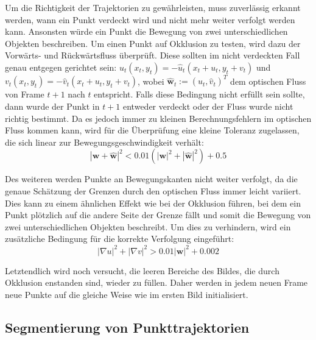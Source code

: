 Um die Richtigkeit der Trajektorien zu gewährleisten, muss zuverlässig erkannt werden, wann ein Punkt verdeckt wird und nicht mehr weiter verfolgt werden
kann. Ansonsten würde ein Punkt die Bewegung von zwei unterschiedlichen Objekten beschreiben. Um einen Punkt auf Okklusion zu testen, wird dazu
der Vorwärts- und Rückwärtsfluss überprüft. Diese sollten im nicht verdeckten Fall genau entgegen gerichtet sein:
$ u_t(x_t,y_t) = -\hat{u}_t(x_t + u_t, y_t + v_t) $ und $ v_t(x_t,y_t) = -\hat{v}_t(x_t + u_t, y_t + v_t) $, wobei
$\hat{\textbf{w}}_t := (\hat{u}_t,\hat{v}_t)^T$ dem optischen Fluss von Frame $t+1$ nach $t$ entspricht. Falls diese Bedingung nicht erfüllt sein sollte,
dann wurde der Punkt in $t+1$ entweder verdeckt oder der Fluss wurde nicht richtig bestimmt. Da es jedoch immer zu kleinen Berechnungsfehlern
im optischen Fluss kommen kann, wird für die Überprüfung eine kleine Toleranz zugelassen, die sich linear zur Bewegungsgeschwindigkeit verhält:
\begin{equation}
  | \textbf{w} + \hat{\textbf{w}}|^2 < 0.01 (|\textbf{w}|^2 + |\hat{\textbf{w}}|^2) + 0.5
\end{equation}

Des weiteren werden Punkte an Bewegungskanten nicht weiter verfolgt, da die genaue Schätzung der Grenzen durch den optischen Fluss immer leicht
variiert. Dies kann zu einem ähnlichen Effekt wie bei der Okklusion führen, bei dem ein Punkt plötzlich auf die andere Seite der Grenze fällt
und somit die Bewegung von zwei unterschiedlichen Objekten beschreibt. Um dies zu verhindern, wird ein zusätzliche Bedingung für die korrekte
Verfolgung eingeführt:
\begin{equation}
  |\nabla u|^2 + |\nabla v|^2 > 0.01 |\textbf{w}|^2 + 0.002
\end{equation}

Letztendlich wird noch versucht, die leeren Bereiche des Bildes, die durch Okklusion enstanden sind, wieder zu füllen. Daher werden in jedem neuen Frame
neue Punkte auf die gleiche Weise wie im ersten Bild initialisiert.


\subsection{Segmentierung von Punkttrajektorien}

